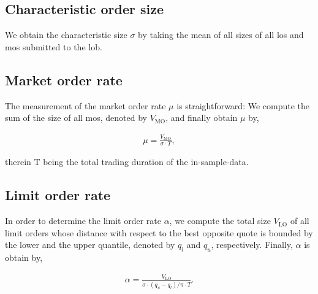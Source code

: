 \documentclass[11pt, a4paper]{thesis}  %
\begin{document}
\subsection{Characteristic order size} 

We obtain the characteristic size $\sigma$ by taking the mean of all sizes of all \acp{lo} and \acp{mo} submitted to the \ac{lob}. 


\subsection{Market order rate} 

The measurement of the market order rate $\mu$ is straightforward: We compute the sum of the size of all \acp{mo}, denoted by $V_\textrm{MO}$,  and finally obtain $\mu$ by,

\begin{eqnarray}
	\mu = \frac{V_\textrm{MO}}{\sigma\cdot T},
\end{eqnarray}

\noindent therein T being the total trading duration of the in-sample-data.

\subsection{Limit order rate} 
\label{section:methods:calibrate_alpha}

In order to determine the limit order rate $\alpha$, we compute the total size $V_\textrm{LO}$ of all limit orders whose distance with respect to the best opposite quote is bounded by the lower and the upper quantile, denoted by $q_l$ and $q_u$, respectively. Finally, $\alpha$ is obtain by, 

\begin{eqnarray}	
	\alpha = \frac{V_\textrm{LO}}
	{\sigma\cdot (q_u - q_l)/\pi\cdot T}.
\end{eqnarray}

\end{document}
